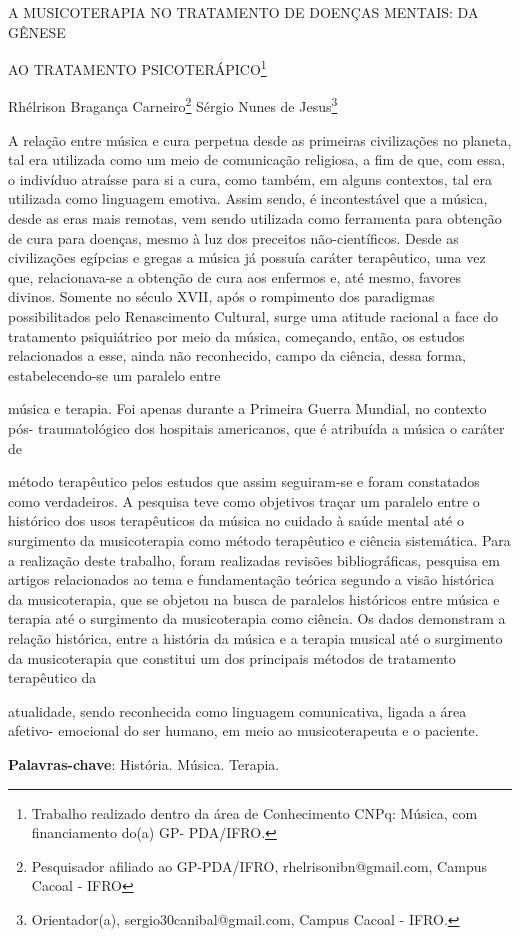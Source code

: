 \documentclass[article,12pt,onesidea,4paper,english,brazil]{abntex2}
\begin{document}
	
	
	\frenchspacing 
	
	\begin{center}
		\LARGE A MUSICOTERAPIA NO TRATAMENTO DE DOENÇAS MENTAIS: DA GÊNESE
		
		AO TRATAMENTO PSICOTERÁPICO\footnote{Trabalho realizado dentro da área de Conhecimento CNPq: Música, com financiamento do(a) GP-
			PDA/IFRO.}
		
		\normalsize
		Rhélrison Bragança Carneiro\footnote{Pesquisador afiliado ao GP-PDA/IFRO, rhelrisonibn@gmail.com, Campus Cacoal - IFRO} 
		Sérgio Nunes de Jesus\footnote{Orientador(a), sergio30canibal@gmail.com, Campus Cacoal - IFRO.} 
	
	\end{center}
	
	\noindent A relação entre música e cura perpetua desde as primeiras civilizações no planeta,
	tal era utilizada como um meio de comunicação religiosa, a fim de que, com essa, o
	indivíduo atraísse para si a cura, como também, em alguns contextos, tal era
	utilizada como linguagem emotiva. Assim sendo, é incontestável que a música,
	desde as eras mais remotas, vem sendo utilizada como ferramenta para obtenção
	de cura para doenças, mesmo à luz dos preceitos não-científicos. Desde as
	civilizações egípcias e gregas a música já possuía caráter terapêutico, uma vez que,
	relacionava-se a obtenção de cura aos enfermos e, até mesmo, favores divinos.
	Somente no século XVII, após o rompimento dos paradigmas possibilitados pelo
	Renascimento Cultural, surge uma atitude racional a face do tratamento psiquiátrico
	por meio da música, começando, então, os estudos relacionados a esse, ainda não
	reconhecido, campo da ciência, dessa forma, estabelecendo-se um paralelo entre
	
	música e terapia. Foi apenas durante a Primeira Guerra Mundial, no contexto pós-
	traumatológico dos hospitais americanos, que é atribuída a música o caráter de
	
	método terapêutico pelos estudos que assim seguiram-se e foram constatados como
	verdadeiros. A pesquisa teve como objetivos traçar um paralelo entre o histórico dos
	usos terapêuticos da música no cuidado à saúde mental até o surgimento da
	musicoterapia como método terapêutico e ciência sistemática. Para a realização
	deste trabalho, foram realizadas revisões bibliográficas, pesquisa em artigos
	relacionados ao tema e fundamentação teórica segundo a visão histórica da
	musicoterapia, que se objetou na busca de paralelos históricos entre música e
	terapia até o surgimento da musicoterapia como ciência. Os dados demonstram a
	relação histórica, entre a história da música e a terapia musical até o surgimento da
	musicoterapia que constitui um dos principais métodos de tratamento terapêutico da
	
	atualidade, sendo reconhecida como linguagem comunicativa, ligada a área afetivo-
	emocional do ser humano, em meio ao musicoterapeuta e o paciente.
	
	\vspace{\onelineskip}
	
	\noindent
	\textbf{Palavras-chave}: História. Música. Terapia.
	
\end{document}
